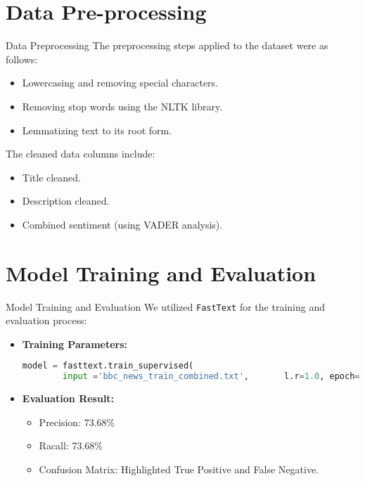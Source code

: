 \documentclass{beamer}
\begin{document}
\section{Data Pre-processing}
\begin{frame}{Data Preprocessing}
The preprocessing steps applied to the dataset were as follows:
\begin{itemize}
\item Lowercasing and removing special characters.
        \item Removing stop words using the NLTK library.
\item Lemmatizing text to its root form.

\end{itemize}
\vspace{0.5cm}
The cleaned data columns include:
\begin{itemize}
    \item Title cleaned.
    \item Description cleaned.
    \item Combined sentiment (using VADER analysis).
\end{itemize}

\end{frame}

\section{Model Training and Evaluation}
\begin{frame}[fragile]{Model Training and Evaluation}
We utilized \texttt{FastText} for the training and evaluation process:
\begin{itemize}
    \item\textbf{Training Parameters:}
\begin{lstlisting}[language=python]
model = fasttext.train_supervised(
        input ='bbc_news_train_combined.txt',       l.r=1.0, epoch=25,wordNgram=2,                  minCount=1, verbose=2)
\end{lstlisting}
\item \textbf{Evaluation Result:}
        \begin{itemize}
            \item Precision: 73.68\%
            \item Racall: 73.68\%
            \item Confusion Matrix: Highlighted True Positive and False Negative.
        \end{itemize}
\end{itemize}
\end{frame}
\end{document}
